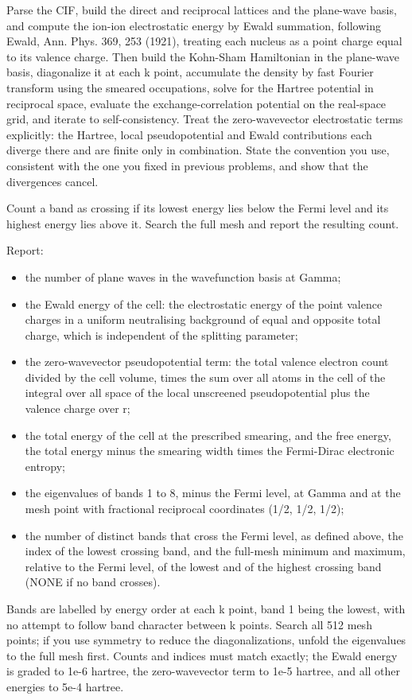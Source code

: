 
Parse the CIF, build the direct and reciprocal lattices and the plane-wave basis, and compute the ion-ion
electrostatic energy by Ewald summation, following Ewald, Ann. Phys. 369, 253 (1921),
treating each nucleus as a point charge equal to its valence
charge. Then build the Kohn-Sham Hamiltonian in the plane-wave basis, diagonalize it at each k point,
accumulate the density by fast Fourier transform using the smeared occupations, solve for the Hartree
potential in reciprocal space, evaluate the exchange-correlation potential on the real-space grid, and iterate
to self-consistency. Treat the zero-wavevector electrostatic terms explicitly: the Hartree, local
pseudopotential and Ewald contributions each diverge there and are finite only in combination. State the
convention you use, consistent with the one you fixed in previous problems, and show that the divergences cancel.



Count a band as crossing if
its lowest energy lies below the Fermi level and its highest energy lies above it. Search the full mesh and report the resulting count.

Report:
\begin{itemize}[leftmargin=13pt,itemsep=1pt,topsep=2pt]
\item the number of plane waves in the wavefunction basis at Gamma;
\item the Ewald energy of the cell: the electrostatic energy of the point valence charges in a uniform
      neutralising background of equal and opposite total charge, which is independent of the splitting
      parameter;
\item the zero-wavevector pseudopotential term: the total valence electron count divided by the cell volume,
      times the sum over all atoms in the cell of the integral over all space of the local unscreened
      pseudopotential plus the valence charge over r;
\item the total energy of the cell at the prescribed smearing, and the free energy, the total energy minus the
      smearing width times the Fermi-Dirac electronic entropy;
\item the eigenvalues of bands 1 to 8, minus the Fermi level, at Gamma and at the mesh point with fractional
      reciprocal coordinates (1/2, 1/2, 1/2);
\item the number of distinct bands that cross the Fermi level, as defined above, the index of the
      lowest crossing band, and the full-mesh minimum and maximum, relative to the Fermi level, of the lowest and of the highest crossing
      band (NONE if no band crosses).
\end{itemize}
Bands are labelled by energy order at each k point, band 1 being the lowest, with no attempt to follow band
character between k points. Search all 512 mesh points; if you use symmetry to reduce the diagonalizations,
unfold the eigenvalues to the full mesh first. Counts and indices must match exactly; the Ewald energy is
graded to 1e-6 hartree, the zero-wavevector term to 1e-5 hartree, and all other energies to 5e-4 hartree.

